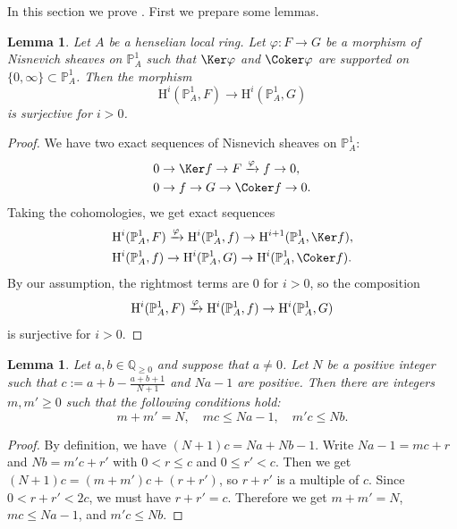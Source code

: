 \documentclass{amsart}
\theoremstyle{plain}
\newtheorem{lemma}[theorem]{Lemma}
\theoremstyle{definition}
\theoremstyle{remark}
\numberwithin{equation}{section}
\let\Im\relax
\begin{document}
In this section we prove .
First we prepare some lemmas.

\begin{lemma}\label{P1_vanishing_lemma}
	Let $A$ be a henselian local ring.
	Let $\varphi\colon F\to G$ be a morphism of Nisnevich sheaves on $\mathbb{P}^1_A$ such that $\Ker \varphi$ and $\Coker \varphi$ are supported on $\{0,\infty\}\subset\mathbb{P}^1_A$.
	Then the morphism
	$$
		\mathrm{H}^i(\mathbb{P}^1_A, F)\to \mathrm{H}^i(\mathbb{P}^1_A, G)
	$$
	is surjective for $i>0$.
\end{lemma}

\begin{proof}
	We have two exact sequences of Nisnevich sheaves on $\mathbb{P}^1_A$:
	\begin{align*}
		&0\to \Ker f\to F\xrightarrow{\varphi} \Im f\to 0,\\
		&0\to \Im f\to G\to \Coker f\to 0.
	\end{align*}
	Taking the cohomologies, we get exact sequences
	\begin{align*}
		&\mathrm{H}^i(\mathbb{P}^1_A,F)\xrightarrow{\varphi} \mathrm{H}^i(\mathbb{P}^1_A,\Im f)\to \mathrm{H}^{i+1}(\mathbb{P}^1_A,\Ker f),\\
		&\mathrm{H}^i(\mathbb{P}^1_A,\Im f)\to \mathrm{H}^i(\mathbb{P}^1_A,G)\to \mathrm{H}^i(\mathbb{P}^1_A,\Coker f).
	\end{align*}
	By our assumption, the rightmost terms are $0$ for $i>0$, so the composition
	$$
		\mathrm{H}^i(\mathbb{P}^1_A,F)\xrightarrow{\varphi} \mathrm{H}^i(\mathbb{P}^1_A,\Im f)\to \mathrm{H}^i(\mathbb{P}^1_A,G)
	$$
	is surjective for $i>0$.
\end{proof}

\begin{lemma}\label{construction_of_m}
    Let $a,b\in \mathbb{Q}_{\geq 0}$ and suppose that $a\neq 0$.
    Let $N$ be a positive integer such that $c:=a+b-\frac{a+b+1}{N+1}$ and $Na-1$ are positive.
    Then there are integers $m,m'\geq 0$ such that the following conditions hold:
    $$
        m+m'=N,\quad mc \leq Na-1,\quad m'c\leq Nb.
    $$
\end{lemma}

\begin{proof}
    By definition, we have $(N+1)c = Na+Nb-1$.
    Write $Na-1=mc+r$ and $Nb = m'c+r'$ with $0 < r \leq c$ and $0 \leq r' < c$.
    Then we get $(N+1)c = (m+m')c+(r+r')$, so $r+r'$ is a multiple of $c$.
    Since $0< r+r'< 2c$, we must have $r+r'=c$.
    Therefore we get $m+m'=N$, $mc\leq Na-1$, and $m'c\leq Nb$.
\end{proof}
\end{document}
